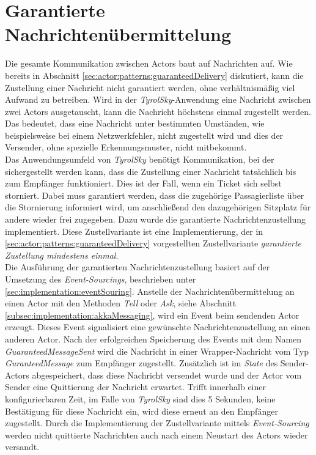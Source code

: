 \section{Garantierte Nachrichtenübermittelung}
Die gesamte Kommunikation zwischen Actors baut auf Nachrichten auf. Wie bereits in Abschnitt \ref{sec:actor:patterns:guaranteedDelivery} diskutiert, kann die Zustellung einer Nachricht nicht garantiert werden, ohne verhältnismäßig viel Aufwand zu betreiben. Wird in der \textit{TyrolSky}-Anwendung eine Nachricht zwischen zwei Actors ausgetauscht, kann die Nachricht höchstens einmal zugestellt werden. Das bedeutet, dass eine Nachricht unter bestimmten Umständen, wie beispielsweise bei einem Netzwerkfehler, nicht zugestellt wird und dies der Versender, ohne spezielle Erkennungsmuster, nicht mitbekommt. \\
Das Anwendungsumfeld von \textit{TyrolSky} benötigt Kommunikation, bei der sichergestellt werden kann, dass die Zustellung einer Nachricht tatsächlich bis zum Empfänger funktioniert. Dies ist der Fall, wenn ein Ticket sich selbst storniert. Dabei muss garantiert werden, dass die zugehörige Passagierliste über die Stornierung informiert wird, um anschließend den dazugehörigen Sitzplatz für andere wieder frei zugegeben. Dazu wurde die garantierte Nachrichtenzustellung implementiert. Diese Zustellvariante ist eine Implementierung, der in \ref{sec:actor:patterns:guaranteedDelivery} vorgestellten Zustellvariante \textit{garantierte Zustellung mindestens einmal}. \\
Die Ausführung der garantierten Nachrichtenzustellung basiert auf der Umsetzung des \textit{Event-Sourcings}, beschrieben unter \ref{sec:implementation:eventSouring}.
Anstelle der Nachrichtenübermittelung an einen Actor mit den Methoden \textit{Tell} oder \textit{Ask}, siehe Abschnitt \ref{subsec:implementation:akkaMessaging}, wird ein Event beim sendenden Actor erzeugt. Dieses Event signalisiert eine gewünschte Nachrichtenzustellung an einen anderen Actor. Nach der erfolgreichen Speicherung des Events mit dem Namen \textit{GuaranteedMessageSent} wird die Nachricht in einer Wrapper-Nachricht vom Typ \textit{GuranteedMessage} zum Empfänger zugestellt. Zusätzlich ist im \textit{State} des Sender-Actors abgespeichert, dass diese Nachricht versendet wurde und der Actor vom Sender eine Quittierung der Nachricht erwartet. Trifft innerhalb einer konfigurierbaren Zeit, im Falle von \textit{TyrolSky} sind dies 5 Sekunden, keine Bestätigung für diese Nachricht ein, wird diese erneut an den Empfänger zugestellt. Durch die Implementierung der Zustellvariante mittels \textit{Event-Sourcing} werden nicht quittierte Nachrichten auch nach einem Neustart des Actors wieder versandt. \\
